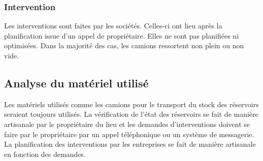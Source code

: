 \subsubsection{Intervention}

Les interventions sont faites par les sociétés. Celles-ci ont lieu après la planification issue d'un appel de propriétaire. Elles ne sont pas planifiées ni optimisées. Dans la majorité des cas, les camions ressortent non plein ou non vide.

\subsection{Analyse du matériel utilisé}

Les matériels utilisés comme les camions pour le transport du stock des réservoirs seraient toujours utilisés. La vérification de l'état des réservoirs se fait de manière artisanale par le propriétaire du lieu et les demandes d'interventions doivent se faire par le propriétaire par un appel téléphonique ou un système de messagerie. La planification des interventions par les entreprises se fait de manière artisanale en fonction des demandes.

\vfill
\pagebreak

